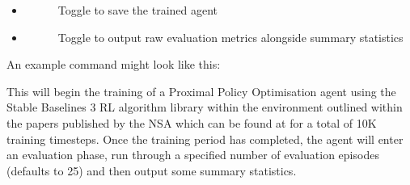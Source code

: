 \documentclass[letterpaper,10pt,english]{sphinxmanual}
\begin{document}
\begin{itemize}
\begin{description}
\end{description}

\item {} \begin{description}
\item[{}] \leavevmode
\sphinxAtStartPar
Toggle to save the trained agent

\end{description}

\item {} \begin{description}
\item[{}] \leavevmode
\sphinxAtStartPar
Toggle to output raw evaluation metrics alongside summary statistics

\end{description}

\end{itemize}

\sphinxAtStartPar
An example command might look like this:

\begin{sphinxVerbatim}[commandchars=\\\{\}]
       
\end{sphinxVerbatim}

\sphinxAtStartPar
This will begin the training of a Proximal Policy Optimisation agent using the Stable Baselines 3 RL algorithm library within the environment outlined within the papers published by the NSA which can be
found at  for a total of 10K training timesteps. Once the training
period has completed, the agent will enter an evaluation phase, run through a specified number of evaluation episodes (defaults to 25) and then output some summary statistics.
\end{document}

